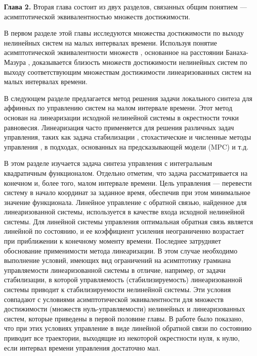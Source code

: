 \documentclass[../main.tex]{subfiles}
\begin{document}
\textbf{Глава 2. }
Вторая глава состоит из двух разделов, связанных общим понятием --- асимптотической эквивалентностью множеств достижимости. 

В первом разделе этой главы исследуются множества достижимости по выходу нелинейных систем на малых интервалах времени.
Используя понятие асимптотической эквивалентности множеств \cite{Ovs}, основанное на расстоянии Банаха-Мазура \cite{Thompson}, доказывается близость множеств достижимости нелинейных систем по выходу соответствующим множествам достижимости линеаризованных систем на малых интервалах времени. 

В следующем разделе предлагается метод решения задачи локального синтеза для аффинных по управлению систем на малом интервале времени. 
Этот метод основан на линеаризации исходной нелинейной системы в окрестности точки равновесия. 
Линеаризация часто применяется для решения различных задач управления, таких как задача стабилизации \cite{Kras_add,Khalil}, стохастические и численные методы управления \cite{Roxin,EKF,denBerg,Pang}, в подходах, основанных на предсказывающей модели (MPC) \cite{Murillo,LTV_MPC} и т.д.

В этом разделе изучается задача синтеза управления с интегральным квадратичным функционалом. 
Отдельно отметим, что задача рассматривается на конечном и, более того, малом интервале времени. 
Цель управления --- перевести систему в начало координат за заданное время, обеспечив при этом минимальное значение функционала. 
Линейное управление с обратной связью, найденное для линеаризованной системы, используется в качестве входа исходной нелинейной системы. 
Для линейной системы управления оптимальная обратная связь является линейной по состоянию, и ее коэффициент усиления неограниченно возрастает при приближении к конечному моменту времени. 
Последнее затрудняет обоснование применимости метода линеаризации. 
В этом случае необходимо выполнение условий, имеющих вид ограничений на асимптотику грамиана управляемости линеаризованной системы в отличие, например, от задачи стабилизации, в которой управляемость (стабилизируемость) линеаризованной системы приводит к стабилизируемости нелинейной системы. 
Эти условия совпадают с условиями асимптотической эквивалентности для множеств достижимости (множеств нуль-управляемости) нелинейных и линеаризованных систем, которые приведены в первой половине главы. 
В работе \cite{GusevOsipov} было показано, что при этих условиях управление в виде линейной обратной связи по состоянию приводит все траектории, выходящие из некоторой окрестности нуля, к нулю, если интервал времени управления достаточно мал. 
\end{document}
